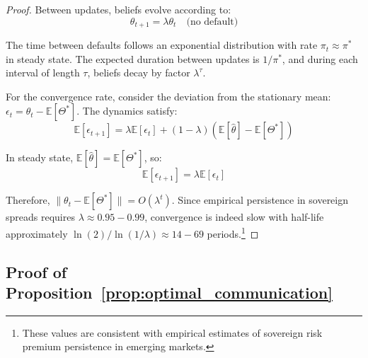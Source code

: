 \documentclass[12pt]{article}
\theoremstyle{plain}
\begin{document}
\begin{proof}
	Between updates, beliefs evolve according to:
	\begin{equation}
		\theta_{t+1} = \lambda \theta_t \quad \text{(no default)} \label{eq:belief_decay}
	\end{equation}

	The time between defaults follows an exponential distribution with rate $\pi_t
		\approx \pi^*$ in steady state. The expected duration between updates is
	$1/\pi^*$, and during each interval of length $\tau$, beliefs decay by factor
	$\lambda^\tau$.

	For the convergence rate, consider the deviation from the stationary mean:
	$\epsilon_t = \theta_t - \mathbb{E}[\Theta^*]$. The dynamics satisfy:
	\begin{equation}
		\mathbb{E}[\epsilon_{t+1}] = \lambda \mathbb{E}[\epsilon_t] + (1-\lambda)(\mathbb{E}[\hat{\theta}] - \mathbb{E}[\Theta^*]) \label{eq:error_dynamics}
	\end{equation}

	In steady state, $\mathbb{E}[\hat{\theta}] = \mathbb{E}[\Theta^*]$, so:
	\begin{equation}
		\mathbb{E}[\epsilon_{t+1}] = \lambda \mathbb{E}[\epsilon_t] \label{eq:convergence_rate}
	\end{equation}

	Therefore, $\|\theta_t - \mathbb{E}[\Theta^*]\| = O(\lambda^t)$. Since
	empirical persistence in sovereign spreads requires $\lambda \approx
		0.95-0.99$, convergence is indeed slow with half-life approximately
	$\ln(2)/\ln(1/\lambda) \approx 14-69$ periods.\footnote{These values are
		consistent with empirical estimates of sovereign risk premium persistence in
		emerging markets.}
\end{proof}

\subsection{Proof of Proposition~\ref{prop:optimal_communication}}\label{app:proof_optimal_communication}
\end{document}
